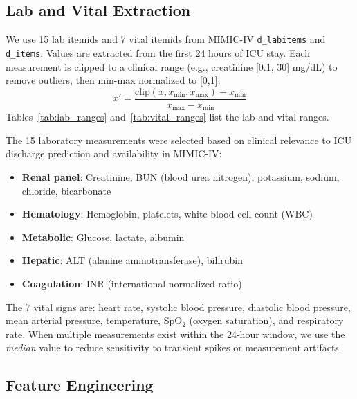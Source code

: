 \subsection{Lab and Vital Extraction}

We use 15 lab itemids and 7 vital itemids from MIMIC-IV \texttt{d\_labitems} and \texttt{d\_items}. Values are extracted from the first 24 hours of ICU stay. Each measurement is clipped to a clinical range (e.g., creatinine [0.1, 30] mg/dL) to remove outliers, then min-max normalized to [0,1]:
\begin{equation}
x' = \frac{\text{clip}(x, x_{\min}, x_{\max}) - x_{\min}}{x_{\max} - x_{\min}}
\end{equation}
Tables~\ref{tab:lab_ranges} and~\ref{tab:vital_ranges} list the lab and vital ranges.



The 15 laboratory measurements were selected based on clinical relevance to ICU discharge prediction and availability in MIMIC-IV:
\begin{itemize}
\item \textbf{Renal panel}: Creatinine, BUN (blood urea nitrogen), potassium, sodium, chloride, bicarbonate
\item \textbf{Hematology}: Hemoglobin, platelets, white blood cell count (WBC)
\item \textbf{Metabolic}: Glucose, lactate, albumin
\item \textbf{Hepatic}: ALT (alanine aminotransferase), bilirubin
\item \textbf{Coagulation}: INR (international normalized ratio)
\end{itemize}

The 7 vital signs are: heart rate, systolic blood pressure, diastolic blood pressure, mean arterial pressure, temperature, SpO$_2$ (oxygen saturation), and respiratory rate. When multiple measurements exist within the 24-hour window, we use the \emph{median} value to reduce sensitivity to transient spikes or measurement artifacts.

\subsection{Feature Engineering}

